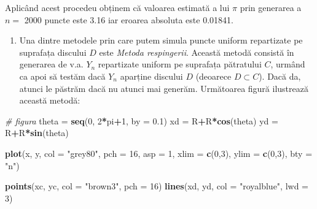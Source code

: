 \documentclass[]{article}
\newenvironment{Shaded}{\begin{snugshade}}{\end{snugshade}}
\newcommand{\KeywordTok}[1]{\textcolor[rgb]{0.13,0.29,0.53}{\textbf{#1}}}
\newcommand{\DataTypeTok}[1]{\textcolor[rgb]{0.13,0.29,0.53}{#1}}
\newcommand{\DecValTok}[1]{\textcolor[rgb]{0.00,0.00,0.81}{#1}}
\newcommand{\FloatTok}[1]{\textcolor[rgb]{0.00,0.00,0.81}{#1}}
\newcommand{\StringTok}[1]{\textcolor[rgb]{0.31,0.60,0.02}{#1}}
\newcommand{\CommentTok}[1]{\textcolor[rgb]{0.56,0.35,0.01}{\textit{#1}}}
\newcommand{\OperatorTok}[1]{\textcolor[rgb]{0.81,0.36,0.00}{\textbf{#1}}}
\newcommand{\NormalTok}[1]{#1}
\providecommand{\tightlist}{%
  \setlength{\itemsep}{0pt}\setlength{\parskip}{0pt}}
\begin{document}
Aplicând acest procedeu obținem că valoarea estimată a lui \(\pi\) prin
generarea a \(n=\) 2000 puncte este 3.16 iar eroarea absoluta este
0.01841.

\begin{enumerate}
\def\labelenumi{\arabic{enumi}.}
\setcounter{enumi}{1}
\tightlist
\item
  Una dintre metodele prin care putem simula puncte uniform repartizate
  pe suprafața discului \(D\) este \emph{Metoda respingerii}. Această
  metodă consistă în generarea de v.a. \(Y_n\) repartizate uniform pe
  suprafața pătratului \(C\), urmând ca apoi să testăm dacă \(Y_n\)
  aparține discului \(D\) (deoarece \(D\subset C\)). Dacă da, atunci le
  păstrăm dacă nu atunci mai generăm. Următoarea figură ilustrează
  această metodă:
\end{enumerate}

\begin{Shaded}
\begin{Highlighting}[]
\CommentTok{# figura }
\NormalTok{theta =}\StringTok{ }\KeywordTok{seq}\NormalTok{(}\DecValTok{0}\NormalTok{, }\DecValTok{2}\OperatorTok{*}\NormalTok{pi}\OperatorTok{+}\DecValTok{1}\NormalTok{, }\DataTypeTok{by =} \FloatTok{0.1}\NormalTok{)}
\NormalTok{xd =}\StringTok{ }\NormalTok{R}\OperatorTok{+}\NormalTok{R}\OperatorTok{*}\KeywordTok{cos}\NormalTok{(theta)}
\NormalTok{yd =}\StringTok{ }\NormalTok{R}\OperatorTok{+}\NormalTok{R}\OperatorTok{*}\KeywordTok{sin}\NormalTok{(theta)}

\KeywordTok{plot}\NormalTok{(x, y, }
     \DataTypeTok{col =} \StringTok{"grey80"}\NormalTok{, }\DataTypeTok{pch =} \DecValTok{16}\NormalTok{,}
     \DataTypeTok{asp =} \DecValTok{1}\NormalTok{, }
     \DataTypeTok{xlim =} \KeywordTok{c}\NormalTok{(}\DecValTok{0}\NormalTok{,}\DecValTok{3}\NormalTok{), }\DataTypeTok{ylim =} \KeywordTok{c}\NormalTok{(}\DecValTok{0}\NormalTok{,}\DecValTok{3}\NormalTok{),}
     \DataTypeTok{bty =} \StringTok{"n"}\NormalTok{)}

\KeywordTok{points}\NormalTok{(xc, yc, }\DataTypeTok{col =} \StringTok{"brown3"}\NormalTok{, }\DataTypeTok{pch =} \DecValTok{16}\NormalTok{)}
\KeywordTok{lines}\NormalTok{(xd, yd, }\DataTypeTok{col =} \StringTok{"royalblue"}\NormalTok{, }\DataTypeTok{lwd =} \DecValTok{3}\NormalTok{)}
\end{Highlighting}
\end{Shaded}
\end{document}
